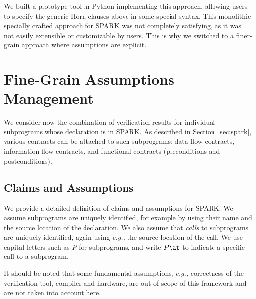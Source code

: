 \documentclass{llncs}
\newcommand{\spark}{SPARK\xspace}
\newcommand{\eg}{\textit{e.g.,}\xspace}
\begin{document}
We built a prototype tool in Python implementing this approach, allowing users
to specify the generic Horn clauses above in some special syntax.  This
monolithic specially crafted approach for \spark was not completely satisfying,
as it was not easily extensible or customizable by users. This is why we
switched to a finer-grain approach where assumptions are explicit.

\section{Fine-Grain Assumptions Management}
\label{sec:claims-and-assumptions-in-spark}

We consider now the combination of verification results for individual
subprograms whose declaration is in \spark. As described in
Section~\ref{sec:spark}, various contracts can be attached to such subprograms:
data flow contracts, information flow contracts, and functional contracts
(preconditions and postconditions).

\subsection{Claims and Assumptions}
\label{sec:claims-and-assumptions-in-spark-sub}

We provide a detailed definition of claims and assumptions for \spark. We
assume subprograms are uniquely identified, for example by using their name
and the source location of the declaration. We also assume that {\em calls} to
subprograms are uniquely identified, again using \eg the source location of
the call. We use capital letters such as $P$ for subprograms, and write $P\at$
to indicate a specific call to a subprogram.

It should be noted that some fundamental assumptions, \eg correctness of the
verification tool, compiler and hardware, are out of scope of this framework
and are not taken into account here.
\end{document}
